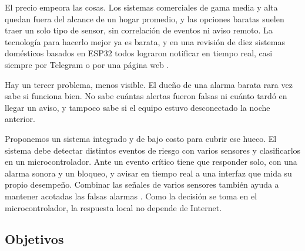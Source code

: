\documentclass[manuscript,screen,nonacm]{acmart}
\begin{document}
El precio empeora las cosas. Los sistemas comerciales de gama media y alta quedan fuera del alcance de un hogar promedio, y las opciones baratas suelen traer un solo tipo de sensor, sin correlación de eventos ni aviso remoto. La tecnología para hacerlo mejor ya es barata, y en una revisión de diez sistemas domésticos basados en ESP32 todos lograron notificar en tiempo real, casi siempre por Telegram o por una página web \cite{oktafiani2025esp32}.

Hay un tercer problema, menos visible. El dueño de una alarma barata rara vez sabe si funciona bien. No sabe cuántas alertas fueron falsas ni cuánto tardó en llegar un aviso, y tampoco sabe si el equipo estuvo desconectado la noche anterior.

Proponemos un sistema integrado y de bajo costo para cubrir ese hueco. El sistema debe detectar distintos eventos de riesgo con varios sensores y clasificarlos en un microcontrolador. Ante un evento crítico tiene que responder solo, con una alarma sonora y un bloqueo, y avisar en tiempo real a una interfaz que mida su propio desempeño. Combinar las señales de varios sensores también ayuda a mantener acotadas las falsas alarmas \cite{pugh2015fusion}. Como la decisión se toma en el microcontrolador, la respuesta local no depende de Internet.

\subsection{Objetivos}
\end{document}
